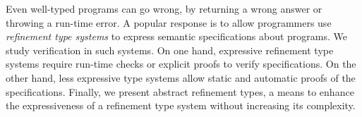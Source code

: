 Even well-typed programs can go wrong,
by returning a wrong answer or 
throwing a run-time error.
A popular response is
to allow programmers use
\textit{refinement type systems}
to express semantic specifications 
about programs.
%
We study verification in such systems.
%
On one hand, expressive refinement type systems
require run-time checks
or explicit proofs to verify specifications.
On the other hand,
less expressive type systems
allow static and automatic proofs of the specifications.
%
Finally, we present abstract refinement types, 
a means to enhance the expressiveness of
a refinement type system without increasing its complexity.